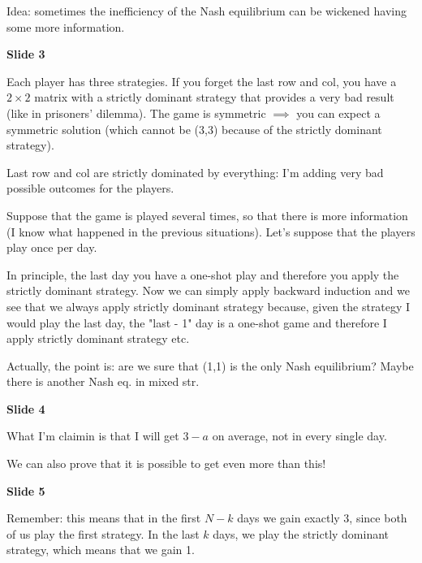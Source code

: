 
%



\bigskip
\noindent Idea: sometimes the inefficiency of the Nash equilibrium can be 
wickened having some more information.

\bigskip
\noindent \textbf{Slide 3}

\noindent Each player has three strategies. If you forget the last row and col, 
you have a $2 \times 2$ matrix with a strictly dominant strategy that 
provides a very bad result (like in prisoners' dilemma). The game is symmetric 
$\implies$ you can expect a symmetric solution (which cannot be (3,3) because 
of the strictly dominant strategy).

\noindent Last row and col are strictly dominated by everything: I'm adding 
very bad possible outcomes for the players.

\noindent Suppose that the game is played several times, so that there is more 
information (I know what happened in the previous situations). Let's suppose 
that the players play once per day.

\noindent In principle, the last day you have a one-shot play and therefore 
you apply the strictly dominant strategy. Now we can simply apply backward 
induction and we see that we always apply strictly dominant strategy because, 
given the strategy I would play the last day, the "last - 1" day is a 
one-shot game and therefore I apply strictly dominant strategy etc.

\noindent Actually, the point is: are we sure that (1,1) is the only Nash 
equilibrium? Maybe there is another Nash eq. in mixed str.

\bigskip
\noindent \textbf{Slide 4}

\noindent What I'm claimin is that I will get $3-a$ on average, not in every 
single day. 

\noindent We can also prove that it is possible to get even more than this!

\bigskip
\noindent \textbf{Slide 5}

\noindent Remember: this means that in the first $N-k$ days we gain exactly 
3, since both of us play the first strategy. In the last $k$ days, we play the 
strictly dominant strategy, which means that we gain 1.

